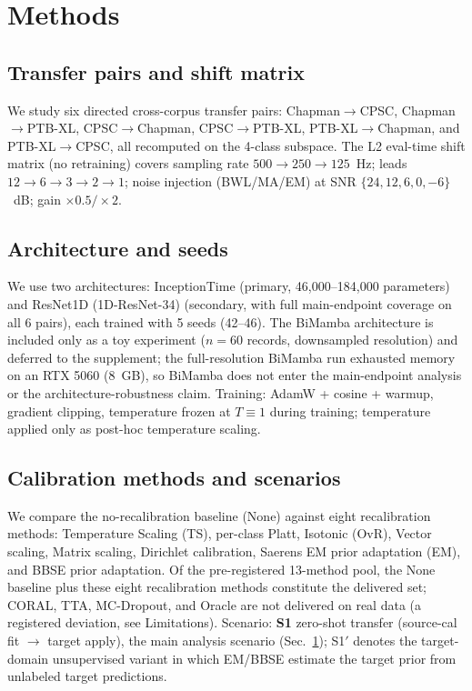 \documentclass[review,12pt,nonatbib]{elsarticle}
\begin{document}
\section{Methods}
\label{sec:methods}
\subsection{Transfer pairs and shift matrix}
\label{sec:shiftmatrix}
We study six directed cross-corpus transfer pairs:
Chapman$\rightarrow$CPSC, Chapman$\rightarrow$PTB-XL,
CPSC$\rightarrow$Chapman, CPSC$\rightarrow$PTB-XL,
PTB-XL$\rightarrow$Chapman, and PTB-XL$\rightarrow$CPSC, all recomputed
on the 4-class subspace. The L2 eval-time shift matrix (no retraining)
covers sampling rate $500\rightarrow250\rightarrow125$~Hz; leads
$12\rightarrow6\rightarrow3\rightarrow2\rightarrow1$; noise injection
(BWL/MA/EM) at SNR $\{24,12,6,0,-6\}$~dB; gain $\times0.5/\times2$.

\subsection{Architecture and seeds}
We use two architectures: InceptionTime (primary, 46{,}000--184{,}000
parameters) and ResNet1D (1D-ResNet-34) (secondary, with full
main-endpoint coverage on all 6 pairs), each trained with 5 seeds
(42--46). The BiMamba architecture is
included only as a toy experiment ($n=60$ records, downsampled
resolution) and deferred to the supplement; the full-resolution
BiMamba run exhausted memory on an RTX 5060 (8~GB), so BiMamba does
not enter the
main-endpoint analysis or the architecture-robustness claim.
Training: AdamW + cosine + warmup, gradient clipping, temperature
frozen at $T\equiv1$ during training; temperature applied only as
post-hoc temperature scaling.

\subsection{Calibration methods and scenarios}
We compare the no-recalibration baseline (None) against eight
recalibration methods: Temperature Scaling (TS), per-class Platt,
Isotonic (OvR), Vector scaling, Matrix scaling, Dirichlet calibration,
Saerens EM prior adaptation (EM), and BBSE prior adaptation.
Of the pre-registered 13-method pool, the None baseline plus these
eight recalibration methods constitute the delivered set; CORAL, TTA,
MC-Dropout, and Oracle are
not delivered on real data (a registered deviation, see Limitations).
Scenario: \textbf{S1} zero-shot transfer (source-cal fit
$\rightarrow$ target apply), the main analysis scenario
(Sec.~\ref{sec:methods}); S1$'$ denotes the target-domain unsupervised
variant in which EM/BBSE estimate the target prior from unlabeled
target predictions.
\end{document}
